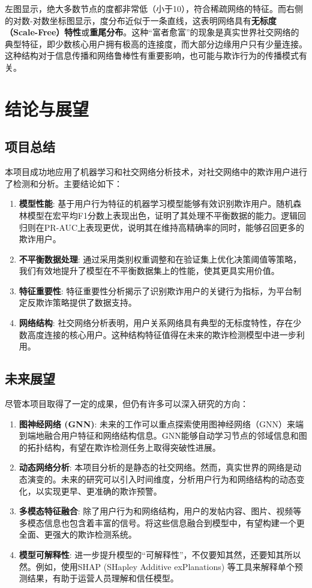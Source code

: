 \documentclass[UTF8]{ctexart}
\begin{document}
左图显示，绝大多数节点的度都非常低（小于10），符合稀疏网络的特征。而右侧的对数-对数坐标图显示，度分布近似于一条直线，这表明网络具有\textbf{无标度（Scale-Free）特性}或\textbf{重尾分布}。这种“富者愈富”的现象是真实世界社交网络的典型特征，即少数核心用户拥有极高的连接度，而大部分边缘用户只有少量连接。这种结构对于信息传播和网络鲁棒性有重要影响，也可能与欺诈行为的传播模式有关。

\section{结论与展望}

\subsection{项目总结}

本项目成功地应用了机器学习和社交网络分析技术，对社交网络中的欺诈用户进行了检测和分析。主要结论如下：

\begin{enumerate}
    \item \textbf{模型性能}: 基于用户行为特征的机器学习模型能够有效识别欺诈用户。随机森林模型在宏平均F1分数上表现出色，证明了其处理不平衡数据的能力。逻辑回归则在PR-AUC上表现更优，说明其在维持高精确率的同时，能够召回更多的欺诈用户。
    \item \textbf{不平衡数据处理}: 通过采用类别权重调整和在验证集上优化决策阈值等策略，我们有效地提升了模型在不平衡数据集上的性能，使其更具实用价值。
    \item \textbf{特征重要性}: 特征重要性分析揭示了识别欺诈用户的关键行为指标，为平台制定反欺诈策略提供了数据支持。
    \item \textbf{网络结构}: 社交网络分析表明，用户关系网络具有典型的无标度特性，存在少数高度连接的核心用户。这种结构特征值得在未来的欺诈检测模型中进一步利用。
\end{enumerate}

\subsection{未来展望}

尽管本项目取得了一定的成果，但仍有许多可以深入研究的方向：

\begin{enumerate}
    \item \textbf{图神经网络 (GNN)}: 未来的工作可以重点探索使用图神经网络（GNN）来端到端地融合用户特征和网络结构信息。GNN能够自动学习节点的邻域信息和图的拓扑结构，有望在欺诈检测任务上取得突破性进展。
    \item \textbf{动态网络分析}: 本项目分析的是静态的社交网络。然而，真实世界的网络是动态演变的。未来的研究可以引入时间维度，分析用户行为和网络结构的动态变化，以实现更早、更准确的欺诈预警。
    \item \textbf{多模态特征融合}: 除了用户行为和网络结构，用户的发帖内容、图片、视频等多模态信息也包含着丰富的信号。将这些信息融合到模型中，有望构建一个更全面、更强大的欺诈检测系统。
    \item \textbf{模型可解释性}: 进一步提升模型的“可解释性”，不仅要知其然，还要知其所以然。例如，使用SHAP (SHapley Additive exPlanations) 等工具来解释单个预测结果，有助于运营人员理解和信任模型。
\end{enumerate}
\end{document}
